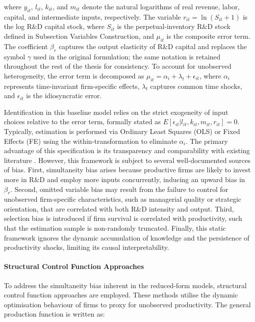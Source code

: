 \documentclass[a4paper, 12pt]{article}
\begin{document}
\noindent where $y_{it}$, $l_{it}$, $k_{it}$, and $m_{it}$ denote the natural logarithms of real revenue, labor, capital, and intermediate inputs, respectively. The variable $r_{it} = \ln(S_{it}+1)$ is the log R\&D capital stock, where $S_{it}$ is the perpetual-inventory R\&D stock defined in Subsection Variables Construction, and $\mu_{it}$ is the composite error term. The coefficient $\beta_r$ captures the output elasticity of R\&D capital and replaces the symbol $\gamma$ used in the original \textcite{griliches1979issues} formulation; the same notation is retained throughout the rest of the thesis for consistency. To account for unobserved heterogeneity, the error term is decomposed as $\mu_{it} = \alpha_i + \lambda_t + \epsilon_{it}$, where $\alpha_i$ represents time-invariant firm-specific effects, $\lambda_t$ captures common time shocks, and $\epsilon_{it}$ is the idiosyncratic error.

Identification in this baseline model relies on the strict exogeneity of input choices relative to the error term, formally stated as $E[\epsilon_{it} | l_{it}, k_{it}, m_{it}, r_{it}] = 0$. Typically, estimation is performed via Ordinary Least Squares (OLS) or Fixed Effects (FE) using the within-transformation to eliminate $\alpha_i$. The primary advantage of this specification is its transparency and comparability with existing literature \parencite{shao2020environmental}. However, this framework is subject to several well-documented sources of bias. First, simultaneity bias arises because productive firms are likely to invest more in R\&D and employ more inputs concurrently, inducing an upward bias in $\beta_r$. Second, omitted variable bias may result from the failure to control for unobserved firm-specific characteristics, such as managerial quality or strategic orientation, that are correlated with both R\&D intensity and output. Third, selection bias is introduced if firm survival is correlated with productivity, such that the estimation sample is non-randomly truncated. Finally, this static framework ignores the dynamic accumulation of knowledge and the persistence of productivity shocks, limiting its causal interpretability.


\paragraph{Structural Control Function Approaches}

To address the simultaneity bias inherent in the reduced-form models, structural control function approaches are employed. These methods utilise the dynamic optimisation behaviour of firms to proxy for unobserved productivity. The general production function is written as: 
\end{document}
